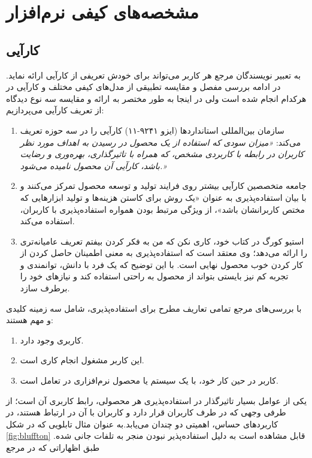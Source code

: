  \section{مشخصه‌های کیفی نرم‌افزار}
 \subsection{کارآیی}
 به تعبیر نویسندگان مرجع
 \cite{albert_measuring_2013}
هر کاربر می‌تواند برای خودش تعریفی از کارآیی ارائه نماید. در ادامه بررسی مفصل و مقایسه تطبیقی از مدل‌های کیفی مختلف و کارآیی در هرکدام انجام شده است ولی در اینجا به طور مختصر به ارائه و مقایسه سه نوع دیدگاه از تعریف کارآیی می‌پردازیم:
\begin{enumerate}
	\item 
	سازمان بین‌المللی استانداردها (ایزو ۹۲۴۱-۱۱) کارآیی را در سه حوزه تعریف می‌کند:
	\emph{«میزان سودی که استفاده از یک محصول در رسیدن به اهداف مورد نظر کاربران در رابطه با کاربردی مشخص، که همراه با تاثیرگذاری، بهره‌وری و رضایت باشد، کارآیی آن محصول نامیده می‌شود.»}
	\item
	جامعه متخصصین کارآیی
	بیشتر روی فرایند تولید و توسعه محصول تمرکز می‌کنند و با بیان استفاده‌پذیری به عنوان «یک روش برای کاستن هزینه‌ها و تولید ابزارهایی که مختص کاربرانشان باشد»، از ویژگی مرتبط بودن همواره استفاده‌پذیری با کاربران، استفاده می‌کند.
	\item 
	استیو کورگ در کتاب خود، کاری نکن که من به فکر کردن بیفتم  تعریف عامیانه‌تری را ارائه می‌دهد؛ وی معتقد است که استفاده‌پذیری به معنی اطمینان حاصل کردن از کار کردن خوب محصول نهایی است. با این توضیح که یک فرد با دانش، توانمندی و تجربه کم نیز بایستی بتواند از محصول به راحتی استفاده کند و نیازهای خود را برطرف سازد.
\end{enumerate}
 با بررسی‌های مرجع
 \cite{albert_measuring_2013}
 تمامی تعاریف مطرح برای استفاده‌پذیری، شامل سه زمینه کلیدی و مهم هستند:
 \begin{enumerate}
 	\item 
 	کاربری وجود دارد.
 	\item 
 	این کاربر مشغول انجام کاری است.
 	\item 
 	کاربر در حین کار خود، با یک سیستم یا محصول نرم‌افزاری در تعامل است.
 \end{enumerate}
 یکی از عوامل بسیار تاثیرگذار در استفاده‌پذیری هر محصولی، رابط کاربری آن است؛ از طرفی وجهی که در طرف کاربران قرار دارد و کاربران با آن‌ در ارتباط هستند، در کاربردهای حساس، اهمیتی دو چندان می‌یابد.به عنوان مثال تابلویی که در شکل
\ref{fig:bluffton}
قابل مشاهده است به دلیل استفاده‌پذیر نبودن منجر به تلفات جانی شده. طبق اظهاراتی که در مرجع 

